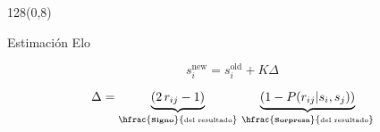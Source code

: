 \documentclass[shownotes]{beamer}
\begin{document}
\begin{frame}
\begin{textblock}{128}(0,8)
\begin{center}
 \large Estimaci\'on Elo 
\end{center}
\end{textblock}
\vspace{0.75cm}


\begin{equation*}
s_i^{\text{new}} = s_i^{\text{old}} + K \Delta
\end{equation*}

\pause
\vspace{0.25cm}


\begin{equation*}
\Delta = \underbrace{(2\,r_{ij}-1)}_{\hfrac{\textbf{\tiny Signo}} {\text{\tiny del resultado}}} \, \underbrace{(1 - P(r_{ij}|s_i,s_j))}_{\hfrac{\textbf{\tiny Sorpresa}}{\text{\tiny del resultado}}}
\end{equation*}


\vspace{0.25cm}


\end{frame}


% 
%  
%  
\end{document}
